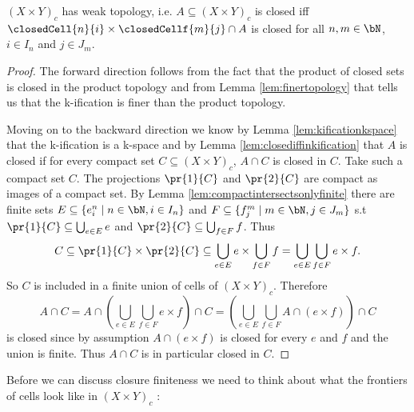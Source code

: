 \begin{lem}\label{lem:weaktopologyproduct}
    $(X \times Y)_c$ has weak topology,
    i.e. $A \subseteq (X \times Y)_c$ is closed iff $\closedCell{n}{i} \times \closedCellf{m}{j} \cap A$ is closed for all $n, m \in \bN$, $i \in I_n$ and $j \in J_m$.
\end{lem}
\begin{proof}
    The forward direction follows from the fact that the product of closed sets is closed in the product topology and from Lemma \ref{lem:finertopology} that tells us that the k-ification is finer than the product topology.

    Moving on to the backward direction we know by Lemma \ref{lem:kificationkspace} that the k-ification is a k-space and by Lemma \ref{lem:closediffinkification} that $A$ is closed if for every compact set $C \subseteq (X \times Y)_c$, $A \cap C$ is closed in $C$.
    Take such a compact set $C$.
    The projections $\pr{1}{C}$ and $\pr{2}{C}$ are compact as images of a compact set. 
    By Lemma \ref{lem:compactintersectsonlyfinite} there are finite sets $E \subseteq \{e_i^n \mid n \in \bN, i \in I_n \}$ and $F \subseteq \{f_j^m \mid m \in \bN, j \in J_m \}$ s.t $\pr{1}{C} \subseteq \bigcup_{e \in E} e$ and $\pr{2}{C} \subseteq \bigcup_{f \in F} f$.
    Thus 
    \[C \subseteq \pr{1}{C} \times \pr{2}{C} \subseteq \bigcup_{e \in E} e \times \bigcup_{f \in F} f = \bigcup_{e \in E} \bigcup_{f \in F} e \times f.\] 
    So $C$ is included in a finite union of cells of $(X \times Y)_c$. 
    Therefore 
    \[A \cap C = A \cap \left (\bigcup_{e \in E} \bigcup_{f \in F} e \times f \right )\cap C = \left (\bigcup_{e \in E} \bigcup_{f \in F} A \cap (e \times f)\right ) \cap C\] 
    is closed since by assumption $A \cap (e \times f)$ is closed for every $e$ and $f$ and the union is finite. Thus $A \cap C$ is in particular closed in $C$.
\end{proof}

Before we can discuss closure finiteness we need to think about what the frontiers of cells look like in $(X \times Y)_c$ : 

